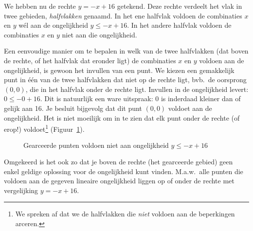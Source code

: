 We hebben nu de rechte $y=-x+16$ getekend. Deze rechte verdeelt het vlak in twee gebieden, \emph{halfvlakken} genaamd. In het ene halfvlak voldoen de combinaties $x$ en $y$ w\'el aan de ongelijkheid $y \leqslant -x + 16$. In het andere halfvlak voldoen de combinaties $x$ en $y$ niet aan die ongelijkheid. 


Een eenvoudige manier om te bepalen in welk van de twee halfvlakken
(dat boven de rechte, of het halfvlak dat eronder ligt) de combinaties $x$ en $y$ voldoen aan  de ongelijkheid, is gewoon het invullen van
een punt. We kiezen een gemakkelijk punt in \'e\'en  van de twee
halfvlakken dat niet op de rechte ligt, bvb.\ de oorsprong $(0,0)$, die in het halfvlak onder
de rechte ligt. Invullen in de ongelijkheid levert: $0 \leq
-0+16$. Dit is natuurlijk een ware uitspraak: 0 is inderdaad
kleiner dan of gelijk aan 16. Je besluit bijgevolg dat dit punt
$(0,0)$ voldoet aan de ongelijkheid. Het is niet moeilijk om in
te zien dat elk punt onder de rechte (of erop!) voldoet\footnote{We
spreken af dat we de halfvlakken die \emph{niet} voldoen aan de beperkingen arceren.}
(Figuur~\ref{fig:ongelijkheid}).

\begin{figure}[htbp]
    \centering
{}
    \caption{Gearceerde punten voldoen niet aan ongelijkheid $y \leqslant -x+16$}
    \label{fig:ongelijkheid}
\end{figure}

Omgekeerd is het ook zo dat je boven de rechte (het gearceerde
gebied) geen enkel geldige oplossing voor de ongelijkheid kunt
vinden. M.a.w.\ alle punten die voldoen aan de gegeven lineaire ongelijkheid
liggen op of onder de rechte met vergelijking $y=-x+16$.



